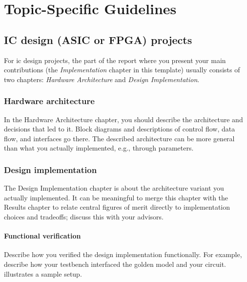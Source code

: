 \chapter{Topic-Specific Guidelines}
\label{app:topic-specific_guidelines}

\section{IC design (ASIC or FPGA) projects}

    For \gls{ic} design projects, the part of the report where you present your main contributions (the \textsl{Implementation} chapter in this template) usually consists of two chapters: \textsl{Hardware Architecture} and \textsl{Design Implementation}.

  \subsection{Hardware architecture}

    In the Hardware Architecture chapter, you should describe the architecture and decisions that led to it.
    Block diagrams and descriptions of control flow, data flow, and interfaces go there.
    The described architecture can be more general than what you actually implemented, e.g., through parameters.

  \subsection{Design implementation}

    The Design Implementation chapter is about the architecture variant you actually implemented.
    It can be meaningful to merge this chapter with the Results chapter to relate central figures of merit directly to implementation choices and tradeoffs; discuss this with your advisors.

    \subsubsection{Functional verification}

      Describe how you verified the design implementation functionally.
      For example, describe how your testbench interfaced the golden model and your circuit.
       illustrates a sample setup.

